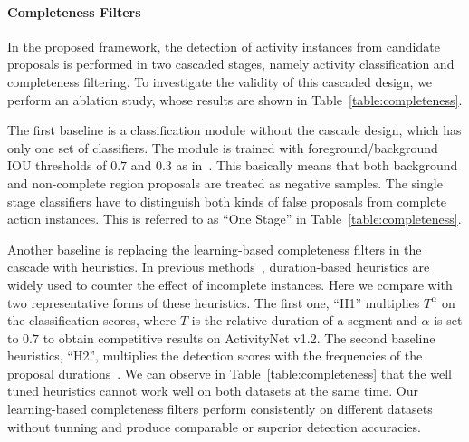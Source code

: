 \documentclass[10pt,twocolumn,letterpaper]{article}
\begin{document}
\paragraph{Completeness Filters}
In the proposed framework, the detection of activity instances from candidate proposals is performed in two cascaded stages, namely activity classification and completeness filtering.
To investigate the validity of this cascaded design, we perform an ablation study,
whose results are shown in Table~\ref{table:completeness}.

The first baseline is a classification module without the cascade design, which has only one set of classifiers.
The module is trained with foreground/background IOU thresholds of $ 0.7 $ and $ 0.3 $ as in~\cite{Shou2016SCNN}.
This basically means that both background and non-complete region proposals are treated as negative samples.
The single stage classifiers have to distinguish both kinds of false proposals from complete action instances.
This is referred to as ``One Stage'' in Table~\ref{table:completeness}.

Another baseline is replacing the learning-based completeness filters in the cascade with heuristics.
In previous methods~\cite{Shou2016SCNN,Oneata2013FV,wang2014action}, duration-based heuristics are widely used to counter the effect of incomplete instances.
Here we compare with two representative forms of these heuristics.
The first one, ``H1'' multiplies $ T^\alpha $ on the classification scores, where $ T $ is the relative duration of a segment and $ \alpha $ is set to $ 0.7 $ to obtain competitive results on ActivityNet v1.2.
The second baseline heuristics, ``H2'', multiplies the detection scores with the frequencies of the proposal durations~\cite{Shou2016SCNN}.
We can observe in Table~\ref{table:completeness} that the well tuned heuristics cannot work well on both datasets at the same time.
Our learning-based completeness filters perform consistently on different datasets without tunning and produce comparable or superior detection accuracies.
\end{document}
